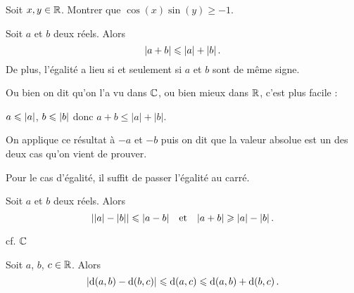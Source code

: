 \documentclass{magnolia}
\begin{document}
\begin{exoUnique}
\exo Soit $x,y\in\mathbb{R}$. Montrer que $\cos(x)\sin(y)\geq -1$.  
\end{exoUnique}

\begin{proposition}
Soit $a$ et $b$ deux réels. Alors
\[\left|a+b\right|\leqslant \left|a\right|+\left|b\right|.\]
De plus, l'égalité a lieu si et seulement si $a$ et $b$ sont de même signe.  
\end{proposition}

\begin{preuve}
Ou bien on dit qu'on l'a vu dans $\mathbb{C}$, ou bien mieux dans $\mathbb{R}$, c'est plus facile :

$a\leqslant \left|a\right|$, $b\leqslant\left|b\right|$ donc $a+b\leq |a|+|b|$.

On applique ce résultat à $-a$ et $-b$ puis on dit que la valeur absolue est un des deux cas qu'on vient de prouver. 

Pour le cas d'égalité, il suffit de passer l'égalité au carré.
\end{preuve}

\begin{proposition}
Soit $a$ et $b$ deux réels. Alors
\[\left|\left|a\right|-\left|b\right|\right|\leqslant\left|a-b\right| \quad\!\text{et}\quad\! \left|a+b\right|\geqslant \left|a\right|-\left|b\right|.\]
\end{proposition}

\begin{preuve}
cf. $\mathbb{C}$
\end{preuve}

\begin{remarqueUnique}
\remarque Soit $a$, $b$, $c\in\mathbb{R}$. Alors
  \[\left|{\rm d}\!\left(a,b\right)-{\rm d}\!\left(b,c\right)\right| \leqslant {\rm d}\!\left(a,c\right) \leqslant
    {\rm d}\!\left(a,b\right)+{\rm d}\!\left(b,c\right).\]
\end{remarqueUnique}
\end{document}
